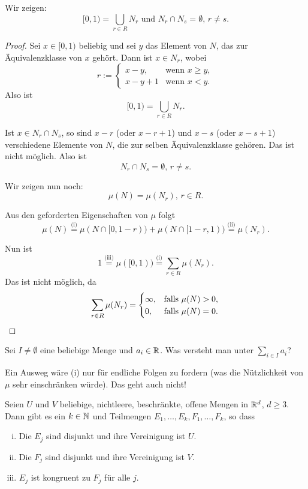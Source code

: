 Wir zeigen:
\[ [0,1) = \bigcup_{r \in R} N_r \text{ und } N_r \cap N_s = \emptyset,\, r \ne s. \]

\begin{proof}
 Sei $x \in [0,1)$ beliebig und sei $y$ das Element von $N$, das zur
 Äquivalenzklasse von $x$ gehört. Dann ist $x \in N_r$, wobei
 \[ r := \begin{cases}
          x-y, & \text{wenn } x \ge y, \\
          x-y+1 & \text{wenn } x < y.
         \end{cases} \]
 Also ist
 \[ [0,1) = \bigcup_{r \in R} N_r. \]
 
 Ist $x \in N_r \cap N_s$, so sind $x-r$ (oder $x-r+1$) und $x-s$ (oder $x-s+1$)
 verschiedene Elemente von $N$, die zur selben Äquivalenzklasse gehören. Das ist
 nicht möglich. Also ist 
 \[ N_r \cap N_s = \emptyset,\, r \ne s. \]

 Wir zeigen nun noch:
 \[ \mu( N ) = \mu(N_r),\, r \in R. \]

 Aus den geforderten Eigenschaften von $\mu$ folgt
 \[ \mu(N) \overset{\text{(i)}}{=} \mu( N \cap [0,1-r) ) + \mu( N \cap [1-r, 1) ) \overset{\text{(ii)}}{=} \mu(N_r). \] 
 
 Nun ist
 \[ 1 \overset{\text{(iii)}}{=} \mu( [0,1) ) \overset{\text{(i)}}{=} \sum_{r \in R} \mu( N_r ). \]
 Das ist nicht möglich, da
 \[ \sum_{r \in R} \mu( N_r ) = 
   \begin{cases}
    \infty, & \text{falls } \mu(N) > 0, \\
    0, & \text{falls } \mu(N) = 0.
   \end{cases} \qedhere \]
\end{proof}

Sei $I \ne \emptyset$ eine beliebige Menge und $a_i \in \mathbb{R}$. Was versteht man
unter $\sum_{i \in I} a_i$? 

Ein Ausweg wäre (i) nur für endliche Folgen zu fordern (was die Nützlichkeit von
$\mu$ sehr einschränken würde). Das geht auch nicht! 

\newpage

\begin{thm}
 Seien $U$ und $V$ beliebige, nichtleere, beschränkte, offene Mengen in
 $\mathbb{R}^d$, $d \ge 3$. Dann gibt es ein $k \in \mathbb{N}$ und Teilmengen $E_1,
 \ldots, E_k, F_1, \ldots, F_k$, so dass 
 \begin{enumerate}[(i)]
  \item Die $E_j$ sind disjunkt und ihre Vereinigung ist $U$.
  \item Die $F_j$ sind disjunkt und ihre Vereinigung ist $V$.
  \item $E_j$ ist kongruent zu $F_j$ für alle $j$.
 \end{enumerate}
\end{thm}

